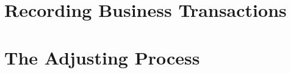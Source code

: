 \documentclass[a4paper, 12pt]{article}
\begin{document}
\section{Recording Business Transactions}




\section{The Adjusting Process}
\end{document}

